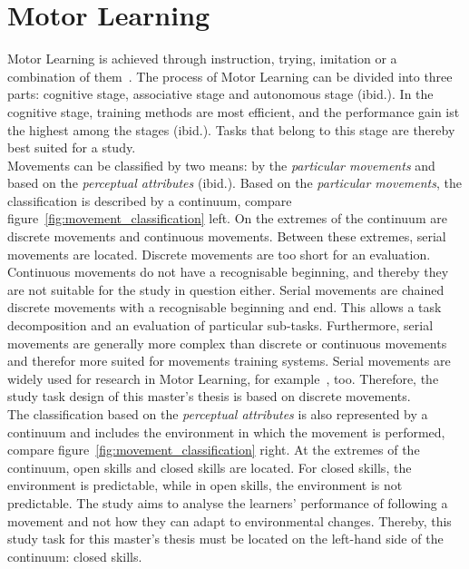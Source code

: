 \section{Motor Learning}
\label{section:motor_learning}
Motor Learning is achieved through instruction, trying, imitation or a combination of them~\cite{mlbook}. The process of Motor Learning can be divided into three parts: cognitive stage, associative stage and autonomous stage (ibid.). In the cognitive stage, training methods are most efficient, and the performance gain ist the highest among the stages (ibid.). Tasks that belong to this stage are thereby best suited for a study.\\
Movements can be classified by two means: by the \textit{particular movements} and based on the \textit{perceptual attributes} (ibid.). Based on the \textit{particular movements}, the classification is described by a continuum, compare figure~\ref{fig:movement_classification} left. On the extremes of the continuum are discrete movements and continuous movements. Between these extremes, serial movements are located. Discrete movements are too short for an evaluation. Continuous movements do not have a recognisable beginning, and thereby they are not suitable for the study in question either. Serial movements are chained discrete movements with a recognisable beginning and end. This allows a task decomposition and an evaluation of particular sub-tasks. Furthermore, serial movements are generally more complex than discrete or continuous movements and therefor more suited for movements training systems. Serial movements are widely used for research in Motor Learning, for example~\cite{lightguide,mythaichicoaches,elearningma}, too. Therefore, the study task design of this master's thesis is based on discrete movements.\\
The classification based on the \textit{perceptual attributes} is also represented by a continuum and includes the environment in which the movement is performed, compare figure~\ref{fig:movement_classification} right. At the extremes of the continuum, open skills and closed skills are located. For closed skills, the environment is predictable, while in open skills, the environment is not predictable. The study aims to analyse the learners' performance of following a movement and not how they can adapt to environmental changes. Thereby, this study task for this master's thesis must be located on the left-hand side of the continuum: closed skills.
